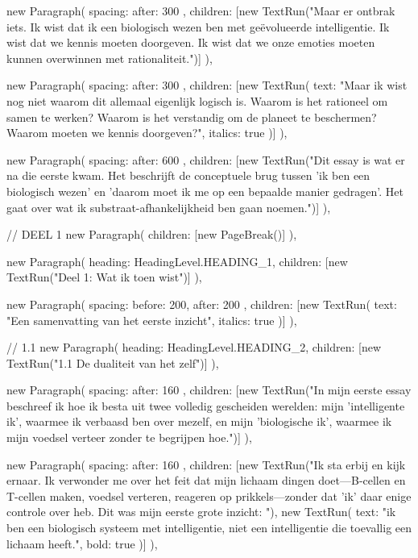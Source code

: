 {{      new Paragraph({
        spacing: { after: 300 },
        children: [new TextRun("Maar er ontbrak iets. Ik wist dat ik een biologisch wezen ben met geëvolueerde intelligentie. Ik wist dat we kennis moeten doorgeven. Ik wist dat we onze emoties moeten kunnen overwinnen met rationaliteit.")]
      }),

      new Paragraph({
        spacing: { after: 300 },
        children: [new TextRun({ text: "Maar ik wist nog niet waarom dit allemaal eigenlijk logisch is. Waarom is het rationeel om samen te werken? Waarom is het verstandig om de planeet te beschermen? Waarom moeten we kennis doorgeven?", italics: true })]
      }),

      new Paragraph({
        spacing: { after: 600 },
        children: [new TextRun("Dit essay is wat er na die eerste kwam. Het beschrijft de conceptuele brug tussen 'ik ben een biologisch wezen' en 'daarom moet ik me op een bepaalde manier gedragen'. Het gaat over wat ik substraat-afhankelijkheid ben gaan noemen.")]
      }),

      // DEEL 1
      new Paragraph({ children: [new PageBreak()] }),

      new Paragraph({
        heading: HeadingLevel.HEADING_1,
        children: [new TextRun("Deel 1: Wat ik toen wist")]
      }),

      new Paragraph({
        spacing: { before: 200, after: 200 },
        children: [new TextRun({ text: "Een samenvatting van het eerste inzicht", italics: true })]
      }),

      // 1.1
      new Paragraph({
        heading: HeadingLevel.HEADING_2,
        children: [new TextRun("1.1 De dualiteit van het zelf")]
      }),

      new Paragraph({
        spacing: { after: 160 },
        children: [new TextRun("In mijn eerste essay beschreef ik hoe ik besta uit twee volledig gescheiden werelden: mijn 'intelligente ik', waarmee ik verbaasd ben over mezelf, en mijn 'biologische ik', waarmee ik mijn voedsel verteer zonder te begrijpen hoe.")]
      }),

      new Paragraph({
        spacing: { after: 160 },
        children: [new TextRun("Ik sta erbij en kijk ernaar. Ik verwonder me over het feit dat mijn lichaam dingen doet—B-cellen en T-cellen maken, voedsel verteren, reageren op prikkels—zonder dat 'ik' daar enige controle over heb. Dit was mijn eerste grote inzicht: "), new TextRun({ text: "ik ben een biologisch systeem met intelligentie, niet een intelligentie die toevallig een lichaam heeft.", bold: true })]
      }),

}}
